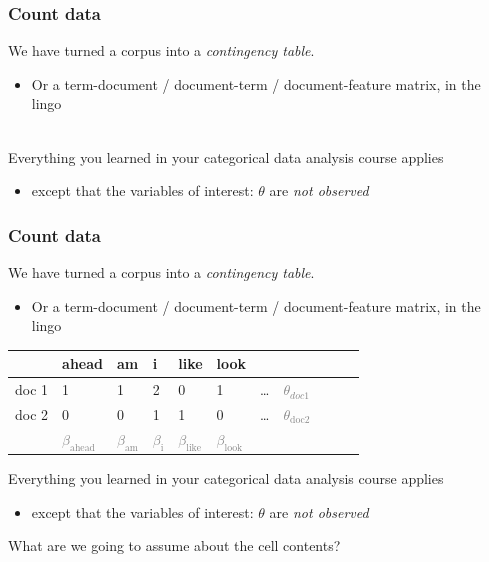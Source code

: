 \documentclass{hertieteaching}\usepackage[]{graphicx}\usepackage[]{color}
\begin{document}
\begin{frame}[t]\frametitle{Count data}

We have turned a corpus into a \textit{contingency table}.
\begin{itemize}
\item Or a term-document / document-term / document-feature matrix, in the lingo
\end{itemize}

~\\
Everything you learned in your categorical data analysis course applies
\begin{itemize}
\item except that the variables of interest: $\theta$ are \textit{not observed}
\end{itemize}


\end{frame}
\begin{frame}[t]\frametitle{Count data}

We have turned a corpus into a \textit{contingency table}.
\begin{itemize}
\item Or a term-document / document-term / document-feature matrix, in the lingo
\end{itemize}

\begin{center}
{\small
\begin{tabular}{rllllllllll}\toprule
      & ahead & am & i & like & look & & \\ \midrule
doc 1 & 1     & 1  & 2 & 0    & 1    & \ldots & \textcolor{gray}{$\theta_{doc1}$} \\
doc 2 & 0     & 0  & 1 & 1    & 0    & \ldots & \textcolor{gray}{$\theta_\text{doc2}$} \\ \midrule
      & \textcolor{gray}{$\beta_\text{ahead}$}
      & \textcolor{gray}{$\beta_\text{am}$}
      & \textcolor{gray}{$\beta_\text{i}$}
      & \textcolor{gray}{$\beta_\text{like}$}
      & \textcolor{gray}{$\beta_\text{look}$} \\ \bottomrule
\end{tabular}
}
\end{center}


Everything you learned in your categorical data analysis course applies
\begin{itemize}
\item except that the variables of interest: $\theta$ are \textit{not observed}
\end{itemize}
What are we going to assume about the cell contents?


\end{frame}
\end{document}
